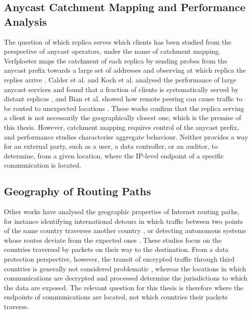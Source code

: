 \subsection{Anycast Catchment Mapping and Performance Analysis}
\label{sc:hunter_sota_catchments}

The question of which replica serves which clients has been studied from the perspective of anycast operators, under the name of catchment mapping. Verfploeter maps the catchment of each replica by sending probes from the anycast prefix towards a large set of addresses and observing at which replica the replies arrive \cite{DeVries2017BroadVerfploeter}. Calder et al. and Koch et al. analysed the performance of large anycast services and found that a fraction of clients is systematically served by distant replicas \cite{Calder2015AnalyzingCDN, Koch2021AnycastSystems}, and Bian et al. showed how remote peering can cause traffic to be routed to unexpected locations \cite{Bian2019TowardsPeering}. These works confirm that the replica serving a client is not necessarily the geographically closest one, which is the premise of this thesis. However, catchment mapping requires control of the anycast prefix, and performance studies characterise aggregate behaviour. Neither provides a way for an external party, such as a user, a data controller, or an auditor, to determine, from a given location, where the IP-level endpoint of a specific communication is located.

\subsection{Geography of Routing Paths}
\label{sc:hunter_sota_paths}

Other works have analysed the geographic properties of Internet routing paths, for instance identifying international detours in which traffic between two points of the same country traverses another country \cite{Shah2016TowardsDetours}, or detecting autonomous systems whose routes deviate from the expected ones \cite{Comarela2016DetectingApplications}. These studies focus on the countries traversed by packets on their way to the destination. From a data protection perspective, however, the transit of encrypted traffic through third countries is generally not considered problematic \cite{RecommendationsBoard}, whereas the locations in which communications are decrypted and processed determine the jurisdictions to which the data are exposed. The relevant question for this thesis is therefore where the endpoints of communications are located, not which countries their packets traverse.

